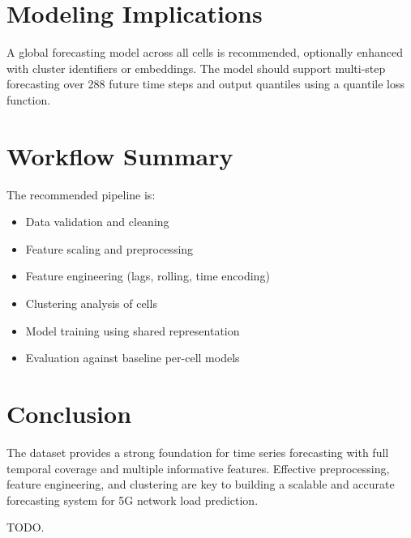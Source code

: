 \documentclass[conference]{IEEEtran}
\begin{document}
\section{Modeling Implications}
A global forecasting model across all cells is recommended, optionally enhanced with cluster identifiers or embeddings. The model should support multi-step forecasting over 288 future time steps and output quantiles using a quantile loss function.

\section{Workflow Summary}
The recommended pipeline is:
\begin{itemize}
\item Data validation and cleaning
\item Feature scaling and preprocessing
\item Feature engineering (lags, rolling, time encoding)
\item Clustering analysis of cells
\item Model training using shared representation
\item Evaluation against baseline per-cell models
\end{itemize}

\section{Conclusion}
The dataset provides a strong foundation for time series forecasting with full temporal coverage and multiple informative features. Effective preprocessing, feature engineering, and clustering are key to building a scalable and accurate forecasting system for 5G network load prediction.

TODO.
\end{document}
